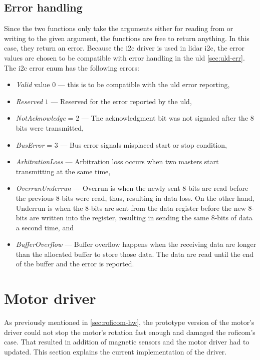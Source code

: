 \documentclass[
  digital,     %
  oneside,     %
  nosansbold,  %
  nocolorbold, %
  nolof,         %
  nolot,         %
]{fithesis4}
\begin{document}
\subsection{ Error handling }

Since the two functions only take the arguments either for reading from or writing to the given
argument, the functions are free to return anything. In this case, they return an error. Because the
\acrshort{i2c} driver is used in \acrshort{lidar} \acrshort{i2c}, the error values are chosen to be
compatible with error handling in the \acrshort{uld} \autoref{sec:uld-err}. The \acrshort{i2c} error
enum has the following errors:

\begin{itemize}
    \item \emph{Valid} value $0$ --- this is to be compatible with the \acrshort{uld} error
        reporting,
    \item \emph{Reserved} $1$ --- Reserved for the error reported by the \acrshort{uld},
    \item \emph{NotAcknowledge} = 2 --- The acknowledgment bit was not signaled after the 8 bits
        were transmitted,
    \item \emph{BusError} = 3 --- Bus error signals misplaced start or stop condition,
    \item \emph{ArbitrationLoss} --- Arbitration loss occurs when two masters start transmitting at
        the same time,
    \item \emph{OverrunUnderrun} --- Overrun is when the newly sent 8-bits are read before the
        previous 8-bits were read, thus, resulting in data loss. On the other hand, Underrun is when
        the 8-bits are sent from the data register before the new 8-bits are written into the
        register, resulting in sending the same 8-bits of data a second time, and
    \item \emph{BufferOverflow} --- Buffer overflow happens when the receiving data are longer than
        the allocated buffer to store those data. The data are read until the end of the buffer and
        the error is reported.
\end{itemize}

\section{ Motor driver }

As previously mentioned in \autoref{sec:roficom-hw}, the prototype version of the motor's driver
could not stop the motor's rotation fast enough and damaged the \acrshort{roficom}'s case. That
resulted in addition of magnetic sensors and the motor driver had to updated. This section explains
the current implementation of the driver.
\end{document}

